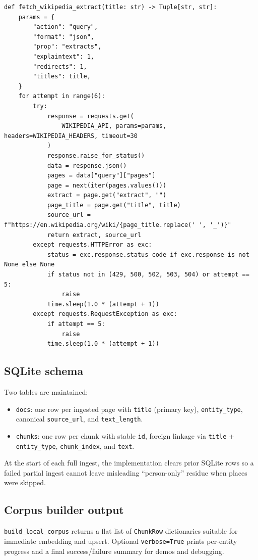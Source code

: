 \documentclass[11pt,a4paper]{article}
\begin{document}
\begin{lstlisting}[caption={Wikipedia fetch with retries (\texttt{wikipedia\_ingest.py}, excerpt).},label={lst:wiki}]
def fetch_wikipedia_extract(title: str) -> Tuple[str, str]:
    params = {
        "action": "query",
        "format": "json",
        "prop": "extracts",
        "explaintext": 1,
        "redirects": 1,
        "titles": title,
    }
    for attempt in range(6):
        try:
            response = requests.get(
                WIKIPEDIA_API, params=params, headers=WIKIPEDIA_HEADERS, timeout=30
            )
            response.raise_for_status()
            data = response.json()
            pages = data["query"]["pages"]
            page = next(iter(pages.values()))
            extract = page.get("extract", "")
            page_title = page.get("title", title)
            source_url = f"https://en.wikipedia.org/wiki/{page_title.replace(' ', '_')}"
            return extract, source_url
        except requests.HTTPError as exc:
            status = exc.response.status_code if exc.response is not None else None
            if status not in (429, 500, 502, 503, 504) or attempt == 5:
                raise
            time.sleep(1.0 * (attempt + 1))
        except requests.RequestException as exc:
            if attempt == 5:
                raise
            time.sleep(1.0 * (attempt + 1))
\end{lstlisting}

\subsection{SQLite schema}
Two tables are maintained:
\begin{itemize}[leftmargin=*]
  \item \texttt{docs}: one row per ingested page with \texttt{title} (primary key),
        \texttt{entity\_type}, canonical \texttt{source\_url}, and \texttt{text\_length}.
  \item \texttt{chunks}: one row per chunk with stable \texttt{id}, foreign linkage via
        \texttt{title} + \texttt{entity\_type}, \texttt{chunk\_index}, and \texttt{text}.
\end{itemize}

\noindent
At the start of each full ingest, the implementation clears prior SQLite rows so a failed
partial ingest cannot leave misleading ``person-only'' residue when places were skipped.

\subsection{Corpus builder output}
\texttt{build\_local\_corpus} returns a flat list of \texttt{ChunkRow} dictionaries suitable
for immediate embedding and upsert. Optional \texttt{verbose=True} prints per-entity progress
and a final success/failure summary for demos and debugging.
\end{document}
